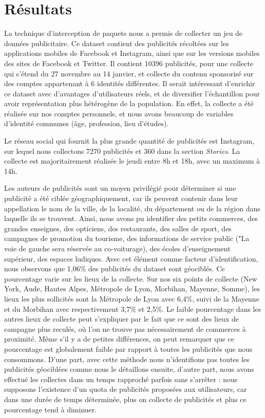 \documentclass[runningheads]{llncs}
\begin{document}
\section{Résultats}\label{analyse_dataset}

La technique d'interception de paquets nous a permis de collecter un jeu de données publicitaire. Ce dataset contient des publicités récoltées sur les applications mobiles de Facebook et Instagram, ainsi que sur les versions mobiles des sites de Facebook et Twitter. Il contient 10396 publicités, pour une collecte qui s'étend du 27 novembre au 14 janvier, et collecte du contenu sponsorisé sur des comptes appartenant à 6 identités différentes. Il serait intéressant d'enrichir ce dataset avec d'avantages d'utilisateurs réels, et de diversifier l'échantillon pour avoir représentation plus hétérogène de la population. En effet, la collecte a été réalisée sur nos comptes personnels, et nous avons beaucoup de variables d'identité communes (âge, profession, lieu d'études). 

Le réseau social qui fournit la plus grande quantité de publicités est Instagram, sur lequel nous collectons 7270 publicités et 360 dans la section \textit{Stories}. La collecte est majoritairement réalisée le jeudi entre 8h et 18h, avec un maximum à 14h. 

Les auteurs de publicités sont un moyen privilégié pour déterminer si une publicité a été ciblée géographiquement, car ils peuvent contenir dans leur appellation le nom de la ville, de la localité, du département ou de la région dans laquelle ils se trouvent. Ainsi, nous avons pu identifier des petits commerces, des grandes enseignes, des opticiens, des restaurants, des salles de sport, des campagnes de promotion du tourisme, des informations de service public ("La voie de gauche sera réservée au co-voiturage), des écoles d'enseignement supérieur, des espaces ludiques. Avec cet élément comme facteur d'identification, nous observons que 1,06\% des publicités du dataset sont géociblés. Ce pourcentage varie sur les lieux de la collecte. Sur nos six points de collecte (New York, Aude, Hautes Alpes, Métropole de Lyon, Morbihan, Mayenne, Somme), les lieux les plus sollicités sont la Métropole de Lyon avec 6,4\%, suivi de la Mayenne et du Morbihan avec respectivement 3,7\% et 2,5\%. Le faible pourcentage dans les autres lieux de collecte peut s'expliquer par le fait que ce sont des lieux de campagne plus reculés, où l'on ne trouve pas nécessairement de commerces à proximité. Même s'il y a de petites différences, on peut remarquer que ce pourcentage est globalement faible par rapport à toutes les publicités que nous consommons. D'une part, avec cette méthode nous n'identifions pas toutes les publicités géociblées comme nous le détaillons ensuite, d'autre part, nous avons effectué les collectes dans un temps rapproché parfois sans s'arrêter : nous supposons l'existence d'un quota de publicités proposées aux utilisateurs, car dans une durée de temps déterminée, plus on collecte de publicités et plus ce pourcentage tend à diminuer.
\end{document}
